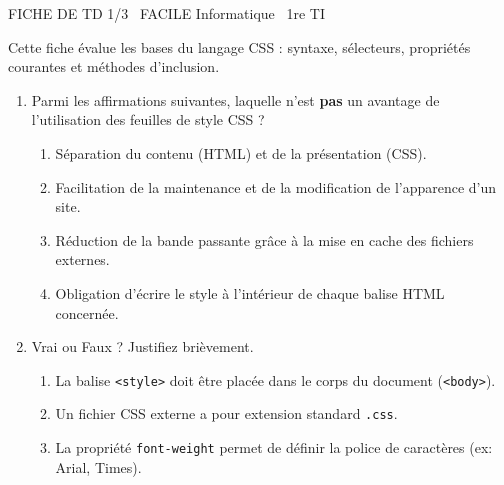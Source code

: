 \documentclass[11pt]{article}
\begin{document}
\begin{tcolorbox}[enhanced,colback=popink,colframe=popink,arc=10pt,boxrule=0pt,left=12pt,right=12pt,top=9pt,bottom=9pt]
{\color{white}\popxbold\small FICHE DE TD 1/3 \textbullet\ FACILE \hfill Informatique \textbullet\ 1re TI\par}
\end{tcolorbox}
\vspace{4pt}
Cette fiche évalue les bases du langage CSS : syntaxe, sélecteurs, propriétés courantes et méthodes d'inclusion.

\begin{exercice}
\begin{enumerate}
    \item Parmi les affirmations suivantes, laquelle n'est \textbf{pas} un avantage de l'utilisation des feuilles de style CSS ?
    \begin{enumerate}
        \item Séparation du contenu (HTML) et de la présentation (CSS).
        \item Facilitation de la maintenance et de la modification de l'apparence d'un site.
        \item Réduction de la bande passante grâce à la mise en cache des fichiers externes.
        \item Obligation d'écrire le style à l'intérieur de chaque balise HTML concernée.
    \end{enumerate}
    \item Vrai ou Faux ? Justifiez brièvement.
    \begin{enumerate}
        \item La balise \texttt{<style>} doit être placée dans le corps du document (\texttt{<body>}).
        \item Un fichier CSS externe a pour extension standard \texttt{.css}.
        \item La propriété \texttt{font-weight} permet de définir la police de caractères (ex: Arial, Times).
    \end{enumerate}
\end{enumerate}
\end{exercice}
\end{document}
